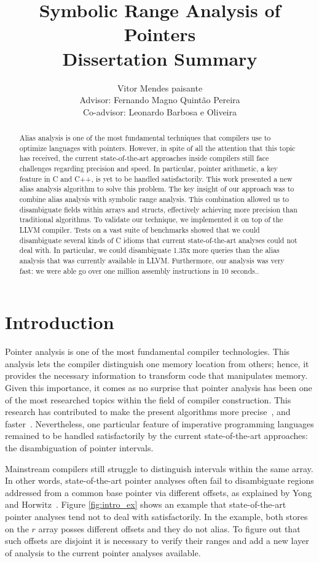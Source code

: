 \documentclass[12pt]{article}
\title{Symbolic Range Analysis of Pointers\\ Dissertation Summary}
\author{Vitor Mendes paisante\\Advisor: Fernando Magno Quintão Pereira\\Co-advisor: Leonardo Barbosa e Oliveira}
\begin{document}
 

\maketitle

\begin{abstract}
Alias analysis is one of the most fundamental techniques that
compilers use to optimize languages with pointers.
However, in spite of all the attention that this topic has received, the current
state-of-the-art approaches inside compilers still face challenges regarding
precision and speed.
In particular, pointer arithmetic, a key feature in C and C++, is yet to be
handled satisfactorily.
This work presented a new alias analysis algorithm to solve this problem.
The key insight of our approach was to combine alias analysis with symbolic
range analysis.
This combination allowed us to disambiguate fields within arrays and structs,
effectively achieving more precision than traditional algorithms.
To validate our technique, we implemented it on top of the LLVM compiler.
Tests on a vast suite of benchmarks showed that we could disambiguate several
kinds of C idioms that current state-of-the-art analyses could not deal with.
In particular, we could disambiguate 1.35x more queries than the alias analysis
that was currently available in LLVM.
Furthermore, our analysis was very fast: we were able go over one million assembly
instructions in 10 seconds..
\end{abstract}
     

\section {Introduction}
Pointer analysis is one of the most fundamental compiler technologies.
This analysis lets the compiler distinguish one memory location from others;
hence, it provides the necessary information to transform code that manipulates
memory.
Given this importance, it comes as no surprise that pointer analysis has been
one of the most researched topics within the field of compiler
construction\cite{Hind01}.
This research has contributed to make the present algorithms more
precise~\cite{Hardekopf07a,Zhang14}, and faster~\cite{Hardekopf11,Shang12}.
Nevertheless, one particular feature of imperative programming languages remained
to be handled satisfactorily by the current state-of-the-art approaches:
the disambiguation of pointer intervals.

Mainstream compilers still struggle to distinguish intervals within the
same array.
In other words, state-of-the-art pointer analyses often fail to disambiguate
regions addressed from a common base pointer via different
offsets, as explained by Yong and Horwitz~\cite{Yong04}. Figure 
\ref{fig:intro_ex} shows an example that state-of-the-art pointer analyses 
tend not to deal with satisfactorily. In the example, both stores on the $r$ 
array posses different offsets and they do not alias. To figure out that such 
offsets are disjoint it is necessary to verify their ranges and add a new layer
of analysis to the current pointer analyses available.
\end{document}
